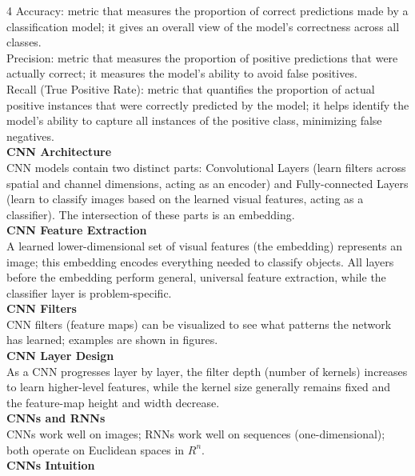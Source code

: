 \documentclass[8pt]{extarticle}
\begin{document}
\begin{multicols}{4}
Accuracy: metric that measures the proportion of correct predictions made by a classification model; it gives an overall view of the model's correctness across all classes.\\
Precision: metric that measures the proportion of positive predictions that were actually correct; it measures the model's ability to avoid false positives.\\
Recall (True Positive Rate): metric that quantifies the proportion of actual positive instances that were correctly predicted by the model; it helps identify the model's ability to capture all instances of the positive class, minimizing false negatives.\\
\vspace{2pt}\textbf{CNN Architecture}\\
CNN models contain two distinct parts: Convolutional Layers (learn filters across spatial and channel dimensions, acting as an encoder) and Fully-connected Layers (learn to classify images based on the learned visual features, acting as a classifier). The intersection of these parts is an embedding.\\
\vspace{2pt}\textbf{CNN Feature Extraction}\\
A learned lower-dimensional set of visual features (the embedding) represents an image; this embedding encodes everything needed to classify objects. All layers before the embedding perform general, universal feature extraction, while the classifier layer is problem-specific.\\
\vspace{2pt}\textbf{CNN Filters}\\
CNN filters (feature maps) can be visualized to see what patterns the network has learned; examples are shown in figures.\\
\vspace{2pt}\textbf{CNN Layer Design}\\
As a CNN progresses layer by layer, the filter depth (number of kernels) increases to learn higher-level features, while the kernel size generally remains fixed and the feature-map height and width decrease.\\
\vspace{2pt}\textbf{CNNs and RNNs}\\
CNNs work well on images; RNNs work well on sequences (one-dimensional); both operate on Euclidean spaces in $R^{n}$.\\
\vspace{2pt}\textbf{CNNs Intuition}\\

\end{multicols}
\end{document}
